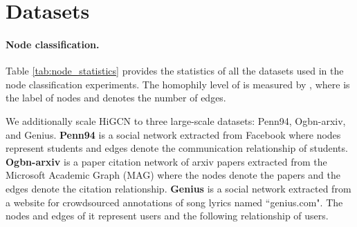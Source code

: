 \documentclass[letterpaper]{article} \usepackage{aaai24}
\theoremstyle{plain}
\theoremstyle{definition}
\theoremstyle{remark}
\begin{document}
\section{Datasets}
\label{appendix: datasets}

\paragraph{Node classification.}
Table \ref{tab:node_statistics} provides the statistics of all the datasets used in the node classification experiments.
The homophily level of  is measured by  \cite{homo2020}, where  is the label of nodes  and  denotes the number of edges.

We additionally scale HiGCN to three large-scale datasets: Penn94, Ogbn-arxiv, and Genius.
\textbf{Penn94} \cite{data:penn94} is a social network extracted from Facebook where nodes represent students and edges denote the communication relationship of students.
\textbf{Ogbn-arxiv} \cite{data:ogbn_arxiv} is a paper citation network of arxiv papers extracted from the Microsoft Academic Graph (MAG) where the nodes denote the papers and the edges denote the citation relationship.
\textbf{Genius} \cite{data:genius} is a social network extracted from a website for crowdsourced annotations of song lyrics named ``genius.com".
The nodes and edges of it represent users and the following relationship of users.
\end{document}
